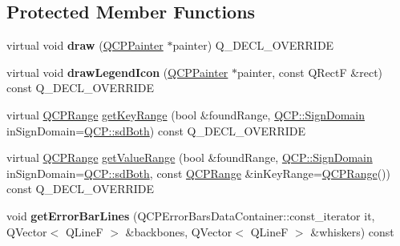 \subsection*{Protected Member Functions}
\begin{DoxyCompactItemize}
\item 
\mbox{\label{class_q_c_p_error_bars_a801e85931372abf2a1034bfb2eac5cd2}} 
virtual void {\bfseries draw} (\hyperlink{class_q_c_p_painter}{Q\+C\+P\+Painter} $\ast$painter) Q\+\_\+\+D\+E\+C\+L\+\_\+\+O\+V\+E\+R\+R\+I\+DE
\item 
\mbox{\label{class_q_c_p_error_bars_a20f5d292e66103f26bca00b11ce417b4}} 
virtual void {\bfseries draw\+Legend\+Icon} (\hyperlink{class_q_c_p_painter}{Q\+C\+P\+Painter} $\ast$painter, const Q\+RectF \&rect) const Q\+\_\+\+D\+E\+C\+L\+\_\+\+O\+V\+E\+R\+R\+I\+DE
\item 
virtual \hyperlink{class_q_c_p_range}{Q\+C\+P\+Range} \hyperlink{class_q_c_p_error_bars_a6cac828a430d66ac77a167549d01d212}{get\+Key\+Range} (bool \&found\+Range, \hyperlink{namespace_q_c_p_afd50e7cf431af385614987d8553ff8a9}{Q\+C\+P\+::\+Sign\+Domain} in\+Sign\+Domain=\hyperlink{namespace_q_c_p_afd50e7cf431af385614987d8553ff8a9aa38352ef02d51ddfa4399d9551566e24}{Q\+C\+P\+::sd\+Both}) const Q\+\_\+\+D\+E\+C\+L\+\_\+\+O\+V\+E\+R\+R\+I\+DE
\item 
virtual \hyperlink{class_q_c_p_range}{Q\+C\+P\+Range} \hyperlink{class_q_c_p_error_bars_ab76215a186ae4862235821e028685f26}{get\+Value\+Range} (bool \&found\+Range, \hyperlink{namespace_q_c_p_afd50e7cf431af385614987d8553ff8a9}{Q\+C\+P\+::\+Sign\+Domain} in\+Sign\+Domain=\hyperlink{namespace_q_c_p_afd50e7cf431af385614987d8553ff8a9aa38352ef02d51ddfa4399d9551566e24}{Q\+C\+P\+::sd\+Both}, const \hyperlink{class_q_c_p_range}{Q\+C\+P\+Range} \&in\+Key\+Range=\hyperlink{class_q_c_p_range}{Q\+C\+P\+Range}()) const Q\+\_\+\+D\+E\+C\+L\+\_\+\+O\+V\+E\+R\+R\+I\+DE
\item 
\mbox{\label{class_q_c_p_error_bars_abeea5ff0d66732bbfc9b74869d8c552e}} 
void {\bfseries get\+Error\+Bar\+Lines} (Q\+C\+P\+Error\+Bars\+Data\+Container\+::const\+\_\+iterator it, Q\+Vector$<$ Q\+LineF $>$ \&backbones, Q\+Vector$<$ Q\+LineF $>$ \&whiskers) const
\item 
\mbox{\label{class_q_c_p_error_bars_aac9ffa98815035d300b2e9a67495ba4c}} 

\end{DoxyCompactItemize}
